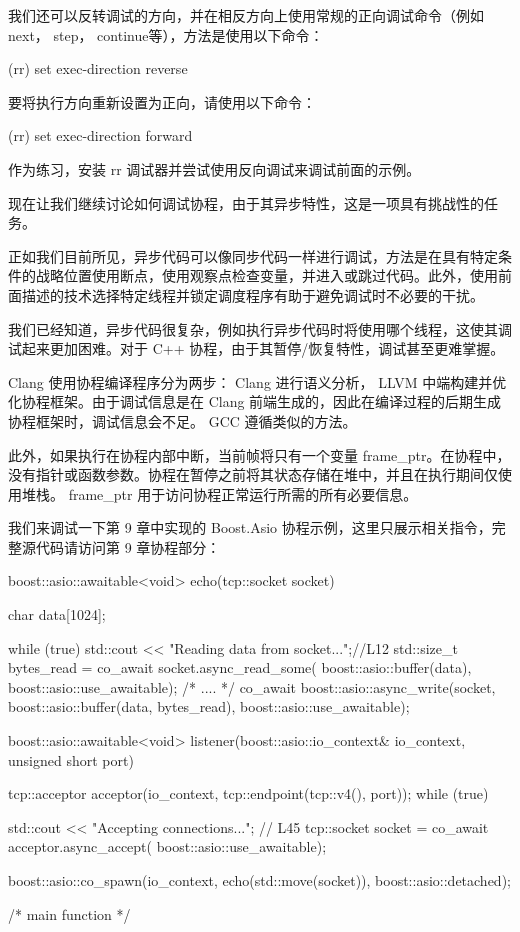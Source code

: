 我们还可以反转调试的方向，并在相反方向上使用常规的正向调试命令（例如next， step， continue等），方法是使用以下命令：

\begin{shell}
(rr) set exec-direction reverse
\end{shell}

要将执行方向重新设置为正向，请使用以下命令：

\begin{shell}
(rr) set exec-direction forward
\end{shell}

作为练习，安装 rr 调试器并尝试使用反向调试来调试前面的示例。

现在让我们继续讨论如何调试协程，由于其异步特性，这是一项具有挑战性的任务。


正如我们目前所见，异步代码可以像同步代码一样进行调试，方法是在具有特定条件的战略位置使用断点，使用观察点检查变量，并进入或跳过代码。此外，使用前面描述的技术选择特定线程并锁定调度程序有助于避免调试时不必要的干扰。

我们已经知道，异步代码很复杂，例如执行异步代码时将使用哪个线程，这使其调试起来更加困难。对于 C++ 协程，由于其暂停/恢复特性，调试甚至更难掌握。

Clang 使用协程编译程序分为两步： Clang 进行语义分析， LLVM 中端构建并优化协程框架。由于调试信息是在 Clang 前端生成的，因此在编译过程的后期生成协程框架时，调试信息会不足。 GCC 遵循类似的方法。

此外，如果执行在协程内部中断，当前帧将只有一个变量 frame\_ptr。在协程中，没有指针或函数参数。协程在暂停之前将其状态存储在堆中，并且在执行期间仅使用堆栈。 frame\_ptr 用于访问协程正常运行所需的所有必要信息。

我们来调试一下第 9 章中实现的 Boost.Asio 协程示例，这里只展示相关指令，完整源代码请访问第 9 章协程部分：

\begin{cpp}
boost::asio::awaitable<void> echo(tcp::socket socket) {
    char data[1024];

    while (true) {
        std::cout << "Reading data from socket...\n";//L12
        std::size_t bytes_read = co_await
            socket.async_read_some(
                boost::asio::buffer(data),
                             boost::asio::use_awaitable);
        /* .... */
        co_await boost::asio::async_write(socket,
                boost::asio::buffer(data, bytes_read),
                boost::asio::use_awaitable);
    }
}

boost::asio::awaitable<void>
listener(boost::asio::io_context& io_context,
         unsigned short port) {
    tcp::acceptor acceptor(io_context,
                           tcp::endpoint(tcp::v4(), port));
    while (true) {
        std::cout << "Accepting connections...\n"; // L45
        tcp::socket socket = co_await
            acceptor.async_accept(
                boost::asio::use_awaitable);

        boost::asio::co_spawn(io_context,
            echo(std::move(socket)),
            boost::asio::detached);
    }
}
/* main function */
\end{cpp}

